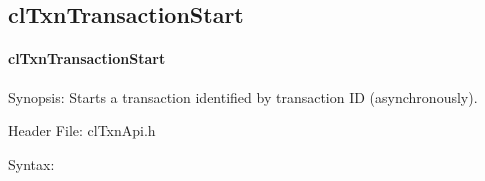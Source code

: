 \begin{flushleft}
\subsection{clTxnTransactionStart}
\hypertarget{pagetxn105}{}\paragraph{cl\-Txn\-Transaction\-Start}\label{pagetxn105}
\begin{Desc}
\item[Synopsis:]Starts a transaction identified by transaction ID (asynchronously).\end{Desc}
\begin{Desc}
\item[Header File:]clTxnApi.h\end{Desc}
\begin{Desc}
\item[Syntax:]


\end{Desc}
\end{flushleft}
